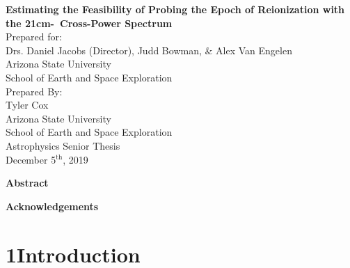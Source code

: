 \documentclass[12pt]{article}
\begin{document}
\doublespacing
\thispagestyle{empty}
\newpage
{}

\begin{center}
	{\Large \textbf{Estimating the Feasibility of Probing the Epoch of Reionization with the
									21cm-\lya\ Cross-Power Spectrum}} \\
	[0.15\textheight]

	Prepared for: \\
	Drs. Daniel Jacobs (Director), Judd Bowman, \&  Alex Van Engelen\\
	Arizona State University \\
	School of Earth and Space Exploration \\[0.15\textheight]

	Prepared By: \\
	Tyler Cox \\
	Arizona State University \\
	School of Earth and Space Exploration \\
	Astrophysics Senior Thesis \\
	December 5$^{\textrm{th}}$, 2019 \\
	[0.15\textheight]

\end{center}
\thispagestyle{empty}

\clearpage
{}

\begin{center}
	\textbf{Abstract}
\end{center}



\begingroup
\hypersetup{
	citecolor=DarkBlue,
	filecolor=black,
	linkcolor=black,
	urlcolor=DarkBlue
}
\renewcommand{\thesection}{\Roman{section}}
\tableofcontents
\listoffigures
\endgroup

\newpage

	\begin{center}
		\textbf{Acknowledgements}
	\end{center}

		




\tocless\section{\hypertarget{sec:introduction}{1\hspace{0.75em}Introduction}}
\end{document}
